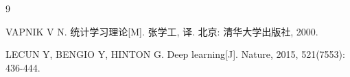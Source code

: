 \documentclass[
  UTF8,
  fontset=fandol,        %
  zihao=-4,              %
  a4paper,
  oneside,               %
]{ctexbook}
\theoremstyle{definition}
\begin{document}
\begin{thebibliography}{9}
VAPNIK V N. 统计学习理论[M]. 张学工, 译. 北京: 清华大学出版社, 2000.

LECUN Y, BENGIO Y, HINTON G. Deep learning[J]. Nature, 2015,
521(7553): 436-444.
\end{thebibliography}
\end{document}
